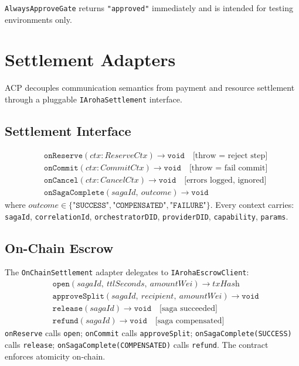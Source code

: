 \documentclass[conference]{IEEEtran}
\begin{document}
\texttt{AlwaysApproveGate} returns \texttt{"approved"} immediately and
is intended for testing environments only.

\section{Settlement Adapters}
\label{sec:settlement}

ACP decouples communication semantics from payment and resource
settlement through a pluggable \texttt{IArohaSettlement} interface.

\subsection{Settlement Interface}

{\small
\begin{align*}
  &\texttt{onReserve}(\textit{ctx}: \textit{ReserveCtx}) \to \texttt{void}
    \quad\text{[throw = reject step]} \\
  &\texttt{onCommit}(\textit{ctx}: \textit{CommitCtx}) \to \texttt{void}
    \quad\text{[throw = fail commit]} \\
  &\texttt{onCancel}(\textit{ctx}: \textit{CancelCtx}) \to \texttt{void}
    \quad\text{[errors logged, ignored]} \\
  &\texttt{onSagaComplete}(\textit{sagaId},\ \textit{outcome})
    \to \texttt{void}
\end{align*}
}
\noindent where $\textit{outcome} \in \{\texttt{"SUCCESS"},
\texttt{"COMPENSATED"}, \texttt{"FAILURE"}\}$.  Every context
carries: \texttt{sagaId}, \texttt{correlationId},
\texttt{orchestratorDID}, \texttt{providerDID}, \texttt{capability},
\texttt{params}.

\subsection{On-Chain Escrow}

The \texttt{OnChainSettlement} adapter delegates to
\texttt{IArohaEscrowClient}:
\begin{align*}
  &\texttt{open}(\textit{sagaId},\ \textit{ttlSeconds},\
    \textit{amountWei}) \to \textit{txHash} \\
  &\texttt{approveSplit}(\textit{sagaId},\ \textit{recipient},\
    \textit{amountWei}) \to \texttt{void} \\
  &\texttt{release}(\textit{sagaId}) \to \texttt{void}
    \quad\text{[saga succeeded]} \\
  &\texttt{refund}(\textit{sagaId}) \to \texttt{void}
    \quad\text{[saga compensated]}
\end{align*}
\texttt{onReserve} calls \texttt{open}; \texttt{onCommit} calls
\texttt{approveSplit}; \texttt{onSagaComplete(SUCCESS)} calls
\texttt{release}; \texttt{onSagaComplete(COMPENSATED)} calls
\texttt{refund}.  The contract~\cite{buterin2014ethereum} enforces
atomicity on-chain.
\end{document}
